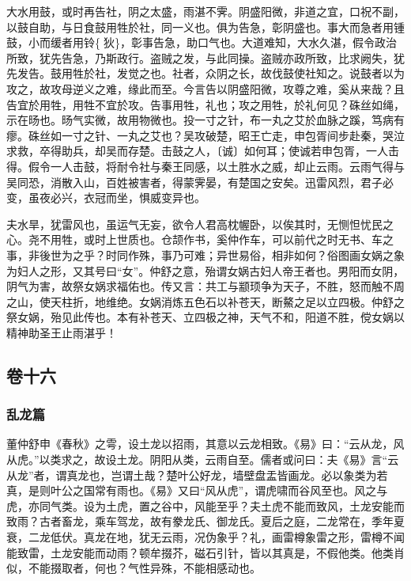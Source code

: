 \documentclass[]{article}
\begin{document}
大水用鼓，或时再告社，阴之太盛，雨湛不霁。阴盛阳微，非道之宜，口祝不副，以鼓自助，与日食鼓用牲於社，同一义也。俱为告急，彰阴盛也。事大而急者用锺鼓，小而缓者用铃\{狄\}，彰事告急，助口气也。大道难知，大水久湛，假令政治所致，犹先告急，乃斯政行。盗贼之发，与此同操。盗贼亦政所致，比求阙失，犹先发告。鼓用牲於社，发觉之也。社者，众阴之长，故伐鼓使社知之。说鼓者以为攻之，故攻母逆义之难，缘此而至。今言告以阴盛阳微，攻尊之难，奚从来哉？且告宜於用牲，用牲不宜於攻。告事用牲，礼也；攻之用牲，於礼何见？硃丝如绳，示在旸也。旸气实微，故用物微也。投一寸之针，布一丸之艾於血脉之蹊，笃病有瘳。硃丝如一寸之针、一丸之艾也？吴攻破楚，昭王亡走，申包胥间步赴秦，哭泣求救，卒得助兵，却吴而存楚。击鼓之人，〔诚〕如何耳；使诚若申包胥，一人击得。假令一人击鼓，将耐令社与秦王同感，以土胜水之威，却止云雨。云雨气得与吴同恐，消散入山，百姓被害者，得蒙霁晏，有楚国之安矣。迅雷风烈，君子必变，虽夜必兴，衣冠而坐，惧威变异也。

夫水旱，犹雷风也，虽运气无妄，欲令人君高枕幄卧，以俟其时，无恻怛忧民之心。尧不用牲，或时上世质也。仓颉作书，奚仲作车，可以前代之时无书、车之事，非後世为之乎？时同作殊，事乃可难；异世易俗，相非如何？俗图画女娲之象为妇人之形，又其号曰``女''。仲舒之意，殆谓女娲古妇人帝王者也。男阳而女阴，阴气为害，故祭女娲求福佑也。传又言：共工与颛顼争为天子，不胜，怒而触不周之山，使天柱折，地维绝。女娲消炼五色石以补苍天，断鰲之足以立四极。仲舒之祭女娲，殆见此传也。本有补苍天、立四极之神，天气不和，阳道不胜，傥女娲以精神助圣王止雨湛乎！

\hypertarget{header-n664}{%
\subsection{卷十六}\label{header-n664}}

\hypertarget{header-n665}{%
\subsubsection{乱龙篇}\label{header-n665}}

董仲舒申《春秋》之雩，设土龙以招雨，其意以云龙相致。《易》曰：``云从龙，风从虎。''以类求之，故设土龙。阴阳从类，云雨自至。儒者或问曰：夫《易》言``云从龙''者，谓真龙也，岂谓土哉？楚叶公好龙，墙壁盘盂皆画龙。必以象类为若真，是则叶公之国常有雨也。《易》又曰``风从虎''，谓虎啸而谷风至也。风之与虎，亦同气类。设为土虎，置之谷中，风能至乎？夫土虎不能而致风，土龙安能而致雨？古者畜龙，乘车驾龙，故有豢龙氏、御龙氏。夏后之庭，二龙常在，季年夏衰，二龙低伏。真龙在地，犹无云雨，况伪象乎？礼，画雷樽象雷之形，雷樽不闻能致雷，土龙安能而动雨？顿牟掇芥，磁石引针，皆以其真是，不假他类。他类肖似，不能掇取者，何也？气性异殊，不能相感动也。
\end{document}
